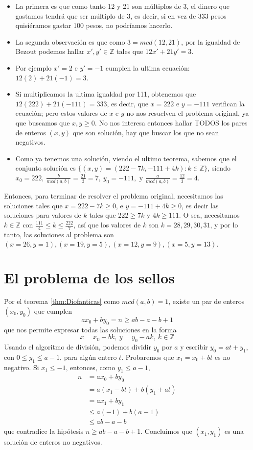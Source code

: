 \documentclass{report}
\begin{document}
{	\begin{itemize}
		\item La primera es que como tanto 12 y 21 son múltiplos de 3, el dinero que gastamos tendrá que ser múltiplo de 3, es decir, si en vez de 333 pesos quisiéramos gastar 100 pesos, no podríamos hacerlo.
		\item La segunda observación es que como $3=mcd(12,21)$, por la igualdad de Bezout podemos hallar $x',y'\in\mathbb{Z}$ tales que $12x'+21y'=3$.
		\item Por ejemplo $x'=2$ e $y'=-1$ cumplen la ultima ecuación: $12(2)+21(-1)=3$.
		\item Si multiplicamos la ultima igualdad por 111, obtenemos que $12(222)+21(-111)=333$, es decir, que $x=222$ e $y=-111$ verifican la ecuación; pero estos valores de $x$ e $y$ no nos resuelven el problema original, ya que buscamos que $x,y\ge0$. No nos interesa entonces hallar TODOS los pares de enteros $(x,y)$ que son solución, hay que buscar los que no sean negativos.
		\item Como ya tenemos una solución, viendo el ultimo teorema, sabemos que el conjunto solución es $\{(x,y)=(222-7k,-111+4k): k\in\mathbb{Z}\}$, siendo $x_0=222,\ \frac{b}{mcd(a,b)}=\frac{21}{3}=7,\ y_0=-111,$ y $\frac{a}{mcd(a,b)}=\frac{12}{3}=4$.
	\end{itemize}
	Entonces, para terminar de resolver el problema original, necesitamos las soluciones tales que $x=222-7k\ge0$, e $y=-111+4k\ge0$, es decir las soluciones para valores de $k$ tales que $222\ge 7k$ y $4k\ge 111$. O sea, necesitamos $k\in\mathbb{Z}$ con $\frac{111}{4}\le k\le \frac{222}{7}$, así que los valores de $k$ son $k=28,29,30,31$, y por lo tanto, las soluciones al problema son $(x=26,y=1),(x=19,y=5),(x=12,y=9),(x=5,y=13)$.}
\newpage\section{El problema de los sellos}
\begin{myproof}
	Por el teorema \ref{thm:Diofanticas} como $mcd(a,b)=1$, existe un par de enteros $(x_0,y_0)$ que cumplen $$ax_0+by_0=n\ge ab-a-b+1$$que nos permite expresar todas las soluciones en la forma $$x=x_0+bk,\ y=y_0-ak,\ k\in\mathbb{Z}$$Usando el algoritmo de división, podemos dividir $y_0$ por $a$ y escribir $y_0=at+y_1$, con $0\le y_1\le a-1$, para algún entero $t$. Probaremos que $x_1=x_0+bt$ es no negativo. Si $x_1\le -1$, entonces, como $y_1\le a-1$,$$\begin{aligned} n & =ax_{0} +by_{0}\\  & =a( x_{1} -bt) +b( y_{1} +at)\\  & =ax_{1} +by_{1}\\  & \le a( -1) +b( a-1)\\  & \le ab-a-b \end{aligned}$$que contradice la hipótesis $n\ge ab-a-b+1$. Concluimos que $(x_1,y_1)$ es una solución de enteros no negativos.
\end{myproof}
\end{document}

